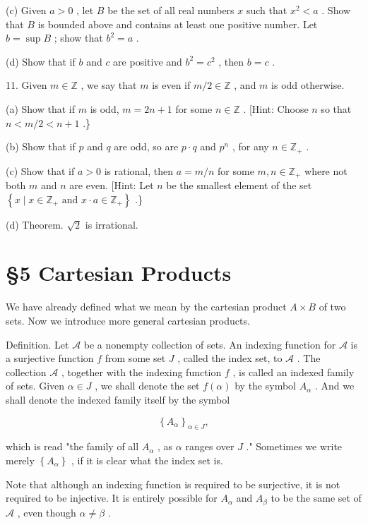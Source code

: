 \documentclass[10pt]{article}
\begin{document}
(c) Given \(a > 0\) , let \(B\) be the set of all real numbers \(x\) such that \({x}^{2} < a\) . Show that \(B\) is bounded above and contains at least one positive number. Let \(b = \sup B\) ; show that \({b}^{2} = a\) .

(d) Show that if \(b\) and \(c\) are positive and \({b}^{2} = {c}^{2}\) , then \(b = c\) .

11. Given \(m \in  \mathbb{Z}\) , we say that \(m\) is even if \(m/2 \in  \mathbb{Z}\) , and \(m\) is odd otherwise.

(a) Show that if \(m\) is odd, \(m = {2n} + 1\) for some \(n \in  \mathbb{Z}\) . [Hint: Choose \(n\) so that \(n < m/2 < n + 1\) .\}

(b) Show that if \(p\) and \(q\) are odd, so are \(p \cdot  q\) and \({p}^{n}\) , for any \(n \in  {\mathbb{Z}}_{ + }\) .

(c) Show that if \(a > 0\) is rational, then \(a = m/n\) for some \(m,n \in  {\mathbb{Z}}_{ + }\) where not both \(m\) and \(n\) are even. [Hint: Let \(n\) be the smallest element of the set \(\left\{  {x \mid  x \in  {\mathbb{Z}}_{ + }\text{ and }x \cdot  a \in  {\mathbb{Z}}_{ + }}\right\}\) .\}

(d) Theorem. \(\sqrt{2}\) is irrational.

\section*{§5 Cartesian Products}

We have already defined what we mean by the cartesian product \(A \times  B\) of two sets. Now we introduce more general cartesian products.

Definition. Let \(\mathcal{A}\) be a nonempty collection of sets. An indexing function for \(\mathcal{A}\) is a surjective function \(f\) from some set \(J\) , called the index set, to \(\mathcal{A}\) . The collection \(\mathcal{A}\) , together with the indexing function \(f\) , is called an indexed family of sets. Given \(\alpha  \in  J\) , we shall denote the set \(f\left( \alpha \right)\) by the symbol \({A}_{\alpha }\) . And we shall denote the indexed family itself by the symbol

\[
{\left\{  {A}_{\alpha }\right\}  }_{\alpha  \in  J},
\]

which is read "the family of all \({A}_{\alpha }\) , as \(\alpha\) ranges over \(J\) ." Sometimes we write merely \(\left\{  {A}_{\alpha }\right\}\) , if it is clear what the index set is.

Note that although an indexing function is required to be surjective, it is not required to be injective. It is entirely possible for \({A}_{\alpha }\) and \({A}_{\beta }\) to be the same set of \(\mathcal{A}\) , even though \(\alpha  \neq  \beta\) .
\end{document}
